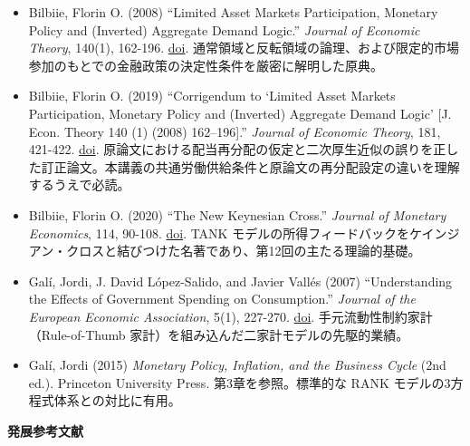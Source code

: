\documentclass[
  japanese,
  lualatex,
  ja=standard,
  12pt,
  a4paper]{ltjsarticle}
\providecommand{\tightlist}{%
  \setlength{\itemsep}{0pt}\setlength{\parskip}{0pt}}
\begin{document}
\begin{itemize}
\tightlist
\item
  Bilbiie, Florin O. (2008) ``Limited Asset Markets Participation,
  Monetary Policy and (Inverted) Aggregate Demand Logic.'' \emph{Journal
  of Economic Theory}, 140(1), 162-196.
  \href{https://doi.org/10.1016/j.jet.2007.07.008}{doi}.
  通常領域と反転領域の論理、および限定的市場参加のもとでの金融政策の決定性条件を厳密に解明した原典。
\item
  Bilbiie, Florin O. (2019) ``Corrigendum to `Limited Asset Markets
  Participation, Monetary Policy and (Inverted) Aggregate Demand Logic'
  {[}J. Econ. Theory 140 (1) (2008) 162--196{]}.'' \emph{Journal of
  Economic Theory}, 181, 421-422.
  \href{https://doi.org/10.1016/j.jet.2019.03.008}{doi}.
  原論文における配当再分配の仮定と二次厚生近似の誤りを正した訂正論文。本講義の共通労働供給条件と原論文の再分配設定の違いを理解するうえで必読。
\item
  Bilbiie, Florin O. (2020) ``The New Keynesian Cross.'' \emph{Journal
  of Monetary Economics}, 114, 90-108.
  \href{https://doi.org/10.1016/j.jmoneco.2019.03.003}{doi}. TANK
  モデルの所得フィードバックをケインジアン・クロスと結びつけた名著であり、第12回の主たる理論的基礎。
\item
  Galí, Jordi, J. David López-Salido, and Javier Vallés (2007)
  ``Understanding the Effects of Government Spending on Consumption.''
  \emph{Journal of the European Economic Association}, 5(1), 227-270.
  \href{https://doi.org/10.1162/JEEA.2007.5.1.227}{doi}.
  手元流動性制約家計（Rule-of-Thumb
  家計）を組み込んだ二家計モデルの先駆的業績。
\item
  Galí, Jordi (2015) \emph{Monetary Policy, Inflation, and the Business
  Cycle} (2nd ed.). Princeton University Press. 第3章を参照。標準的な
  RANK モデルの3方程式体系との対比に有用。
\end{itemize}

\textbf{発展参考文献}
\end{document}
